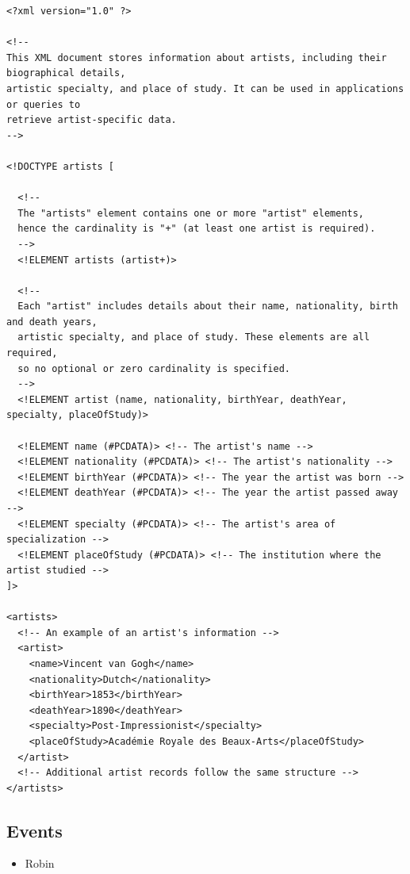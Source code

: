 \documentclass{article} %
\begin{document}
\begin{verbatim}
<?xml version="1.0" ?>

<!-- 
This XML document stores information about artists, including their biographical details, 
artistic specialty, and place of study. It can be used in applications or queries to 
retrieve artist-specific data.
-->

<!DOCTYPE artists [
  
  <!-- 
  The "artists" element contains one or more "artist" elements, 
  hence the cardinality is "+" (at least one artist is required). 
  -->
  <!ELEMENT artists (artist+)>
  
  <!-- 
  Each "artist" includes details about their name, nationality, birth and death years, 
  artistic specialty, and place of study. These elements are all required, 
  so no optional or zero cardinality is specified.
  -->
  <!ELEMENT artist (name, nationality, birthYear, deathYear, specialty, placeOfStudy)>
  
  <!ELEMENT name (#PCDATA)> <!-- The artist's name -->
  <!ELEMENT nationality (#PCDATA)> <!-- The artist's nationality -->
  <!ELEMENT birthYear (#PCDATA)> <!-- The year the artist was born -->
  <!ELEMENT deathYear (#PCDATA)> <!-- The year the artist passed away -->
  <!ELEMENT specialty (#PCDATA)> <!-- The artist's area of specialization -->
  <!ELEMENT placeOfStudy (#PCDATA)> <!-- The institution where the artist studied -->
]>

<artists>
  <!-- An example of an artist's information -->
  <artist>
    <name>Vincent van Gogh</name>
    <nationality>Dutch</nationality>
    <birthYear>1853</birthYear>
    <deathYear>1890</deathYear>
    <specialty>Post-Impressionist</specialty>
    <placeOfStudy>Académie Royale des Beaux-Arts</placeOfStudy>
  </artist>
  <!-- Additional artist records follow the same structure -->
</artists>

\end{verbatim}

\subsection{Events}

\begin{itemize}
    \item Robin
\end{itemize}
\end{document}
